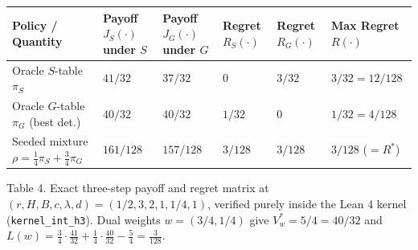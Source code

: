 \documentclass[11pt,a4paper]{article}
\newcounter{none}
\begin{document}
{\def\LTcaptype{none} %
\begin{longtable}[]{@{}
  >{\raggedright\arraybackslash}p{}
  >{\raggedleft\arraybackslash}p{}
  >{\raggedleft\arraybackslash}p{}
  >{\raggedleft\arraybackslash}p{}
  >{\raggedleft\arraybackslash}p{}
  >{\raggedleft\arraybackslash}p{}@{}}
\toprule\noalign{}
\begin{minipage}[b]{\linewidth}\raggedright
Policy / Quantity
\end{minipage} & \begin{minipage}[b]{\linewidth}\raggedleft
Payoff \(J_S(\cdot)\) under \(S\)
\end{minipage} & \begin{minipage}[b]{\linewidth}\raggedleft
Payoff \(J_G(\cdot)\) under \(G\)
\end{minipage} & \begin{minipage}[b]{\linewidth}\raggedleft
Regret \(R_S(\cdot)\)
\end{minipage} & \begin{minipage}[b]{\linewidth}\raggedleft
Regret \(R_G(\cdot)\)
\end{minipage} & \begin{minipage}[b]{\linewidth}\raggedleft
Max Regret \(R(\cdot)\)
\end{minipage} \\
\midrule\noalign{}
\endhead
\bottomrule\noalign{}
\endlastfoot
Oracle \(S\)-table \(\pi_S\) & \(41/32\) & \(37/32\) & \(0\) & \(3/32\)
& \(3/32 = 12/128\) \\
Oracle \(G\)-table \(\pi_G\) (best det.) & \(40/32\) & \(40/32\) &
\(1/32\) & \(0\) & \(1/32 = 4/128\) \\
Seeded mixture \(\rho = \frac{1}{4}\pi_S + \frac{3}{4}\pi_G\) &
\(161/128\) & \(157/128\) & \(3/128\) & \(3/128\) & \textbf{\(3/128\)}
(\(= R^*\)) \\
\end{longtable}
}

Table 4. Exact three-step payoff and regret matrix at
\((r, H, B, c, \lambda, d) = (1/2, 3, 2, 1, 1/4, 1)\), verified purely
inside the Lean 4 kernel (\texttt{kernel\_int\_h3}). Dual weights
\(w = (3/4, 1/4)\) give \(V_w^* = 5/4 = 40/32\) and
\(L(w) = \frac{3}{4}\cdot\frac{41}{32} + \frac{1}{4}\cdot\frac{40}{32} - \frac{5}{4} = \frac{3}{128}\).
\end{document}
